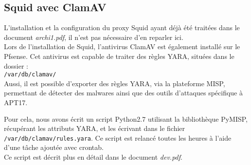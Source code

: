 \subsection{Squid avec ClamAV}

L'installation et la configuration du proxy Squid ayant déjà été traitées dans le document \textit{archi1.pdf}, il n'est pas nécessaire d'en reparler ici. \\

Lors de l'installation de Squid, l'antivirus ClamAV est également installé sur le Pfsense. Cet antivirus est capable de traiter des règles YARA, situées dans le dossier : \\
\texttt{/var/db/clamav/} \\

Aussi, il est possible d'exporter des règles YARA, via la plateforme MISP, permettant de détecter des malwares ainsi que des outils d'attaques spécifique à APT17.

Pour cela, nous avons écrit un script Python2.7 utilisant la bibliothèque PyMISP, récupérant les attributs YARA, et les écrivant dans le fichier \texttt{/var/db/clamav/rules.yara}. Ce script est relancé toutes les heures à l'aide d'une tâche ajoutée avec crontab. \\

Ce script est décrit plus en détail dans le document \textit{dev.pdf}.
